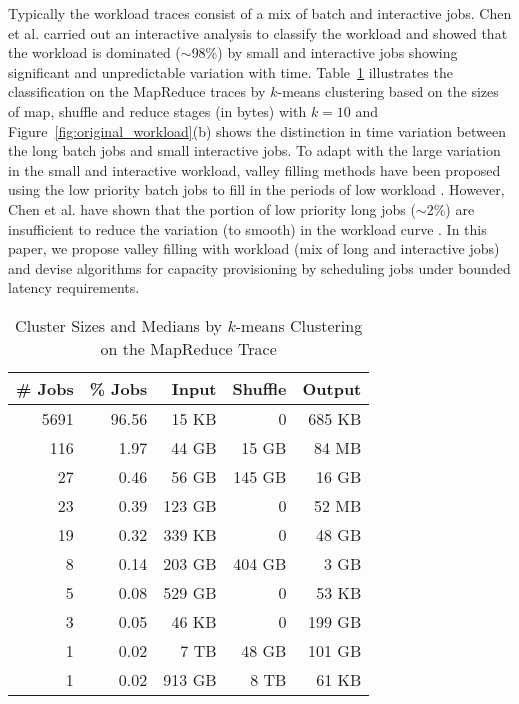 \documentclass[10pt,conference,compsocconf,letterpaper]{IEEEtran}
\begin{document}
Typically the workload traces consist of a mix of batch and interactive jobs. Chen et al. carried out an interactive analysis to classify the workload and showed that the workload is dominated ($\sim$98\%) by small and interactive jobs showing significant and unpredictable variation with time. Table~\ref{table:trace} illustrates the classification on the MapReduce traces by $k$-means clustering based on the sizes of map, shuffle and reduce stages (in bytes) with $k=10$ and Figure~\ref{fig:original_workload}(b) shows the distinction in time variation between the long batch jobs and small interactive jobs. To adapt with the large variation in the small and interactive workload, valley filling methods have been proposed using the low priority batch jobs to fill in the periods of low workload \cite{Liu}. However, Chen et al. have shown that the portion of low priority long jobs ($\sim$2\%) are insufficient to reduce the variation (to smooth) in the workload curve \cite{n5}. In this paper, we propose valley filling with workload (mix of long and interactive jobs) and devise algorithms for capacity provisioning by scheduling jobs under bounded latency requirements.



\begin{table}[!t]
\caption{Cluster Sizes and Medians by $k$-means Clustering on the MapReduce Trace} \centering  \begin{tabular}{r r r r r} \hline\hline                        \# Jobs & \% Jobs & Input & Shuffle & Output \\ [0.5ex] \hline                  5691 & 96.56 & 15 KB & 0 & 685 KB \\ 116 & 1.97 & 44 GB & 15 GB  & 84 MB  \\
27 & 0.46 & 56 GB & 145 GB & 16 GB \\
23 & 0.39 & 123 GB & 0 & 52 MB \\
19 & 0.32 & 339 KB & 0 & 48 GB\\ [1ex]      8 & 0.14 & 203 GB & 404 GB & 3 GB \\
5 & 0.08 & 529 GB & 0 & 53 KB \\
3 & 0.05 & 46 KB & 0 & 199 GB\\
1 & 0.02 & 7 TB & 48 GB & 101 GB \\
1 & 0.02 & 913 GB& 8 TB & 61 KB \\
\hline \end{tabular}
\label{table:trace} \end{table}
\end{document}
